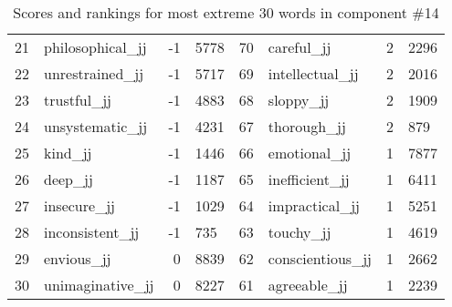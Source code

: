 \begin{table}[tbp]
\begin{tabular}{| rlr@{.}l | rlr@{.}l |}
    21 & philosophical\_jj & -1 & 5778    &    70 & careful\_jj & 2 & 2296 \\
    22 & unrestrained\_jj & -1 & 5717    &    69 & intellectual\_jj & 2 & 2016 \\
    23 & trustful\_jj & -1 & 4883    &    68 & sloppy\_jj & 2 & 1909 \\
    24 & unsystematic\_jj & -1 & 4231    &    67 & thorough\_jj & 2 & 879 \\
    25 & kind\_jj & -1 & 1446    &    66 & emotional\_jj & 1 & 7877 \\
    26 & deep\_jj & -1 & 1187    &    65 & inefficient\_jj & 1 & 6411 \\
    27 & insecure\_jj & -1 & 1029    &    64 & impractical\_jj & 1 & 5251 \\
    28 & inconsistent\_jj & -1 & 735    &    63 & touchy\_jj & 1 & 4619 \\
    29 & envious\_jj & 0 & 8839    &    62 & conscientious\_jj & 1 & 2662 \\
    30 & unimaginative\_jj & 0 & 8227    &    61 & agreeable\_jj & 1 & 2239 \\
    \hline
    \end{tabular}
    \caption{Scores and rankings for most extreme 30 words in component \#14} 
\end{table}
\clearpage
